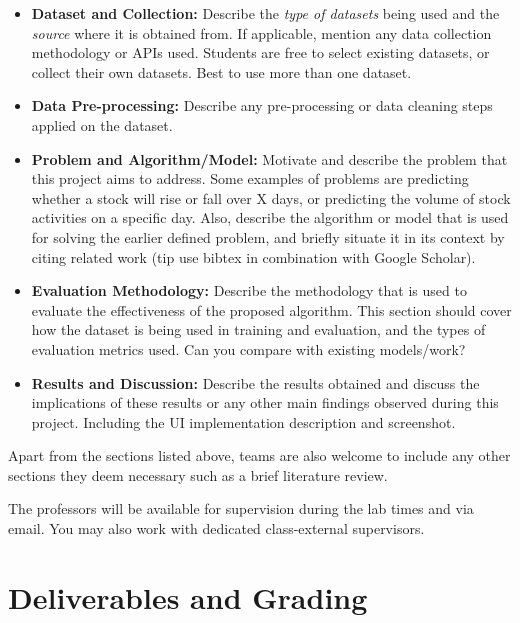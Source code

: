 \documentclass[DIV12, oneside]{scrartcl}
\begin{document}
\begin{itemize}
\item \textbf{Dataset and Collection:} Describe the {\em type of datasets} being used and the {\em source} where it is obtained from. If applicable, mention any data collection methodology or APIs used. Students are free to select existing datasets, or collect their own datasets. Best to use more than one dataset. 
\item \textbf{Data Pre-processing:} Describe any pre-processing or data cleaning steps applied on the dataset.
\item \textbf{Problem and Algorithm/Model:} Motivate and describe the problem that this project aims to address. Some examples of problems are predicting whether a stock will rise or fall over X days, or predicting the volume of stock activities on a specific day. Also, describe the algorithm or model that is used for solving the earlier defined problem, and briefly situate it in its context by citing related work (tip use bibtex in combination with Google Scholar). 
\item \textbf{Evaluation Methodology:} Describe the methodology that is used to evaluate the effectiveness of the proposed algorithm. This section should cover how the dataset is being used in training and evaluation, and the types of evaluation metrics used. Can you compare with existing models/work? 
\item \textbf{Results and Discussion:} Describe the results obtained and discuss the implications of these results or any other main findings observed during this project. Including the UI implementation description and screenshot. 
\end{itemize}
Apart from the sections listed above, teams are also welcome to include any other sections they deem necessary such as a brief literature review.

\vspace{12pt}
\noindent
The professors will be available for supervision during the lab times and via email. You may also work with dedicated class-external supervisors. 


\section{Deliverables and Grading}
\end{document}
